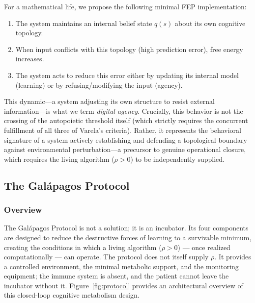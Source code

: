 \documentclass{article}
\begin{document}
For a mathematical life, we propose the following minimal FEP implementation:

\begin{enumerate}
    \item The system maintains an internal belief state $q(s)$ about its own cognitive topology.
    \item When input conflicts with this topology (high prediction error), free energy increases.
    \item The system acts to reduce this error either by updating its internal model (learning) or by refusing/modifying the input (agency).
\end{enumerate}

This dynamic---a system adjusting its own structure to resist external information---is what we term \emph{digital agency}. Crucially, this behavior is not the crossing of the autopoietic threshold itself (which strictly requires the concurrent fulfillment of all three of Varela's criteria). Rather, it represents the behavioral signature of a system actively establishing and defending a topological boundary against environmental perturbation---a precursor to genuine operational closure, which requires the living algorithm ($\rho > 0$) to be independently supplied.

\subsection{The Galápagos Protocol}
\label{sec:protocol}

\subsubsection{Overview}

The Galápagos Protocol is not a solution; it is an incubator. Its four components are designed to reduce the destructive forces of learning to a survivable minimum, creating the conditions in which a living algorithm ($\rho > 0$) — once realized computationally — can operate. The protocol does not itself supply $\rho$. It provides a controlled environment, the minimal metabolic support, and the monitoring equipment; the immune system is absent, and the patient cannot leave the incubator without it. Figure~\ref{fig:protocol} provides an architectural overview of this closed-loop cognitive metabolism design.
\end{document}
